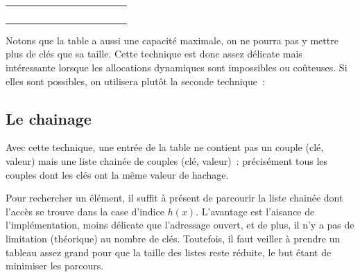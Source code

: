 		\begin{center}
			\tablefirsthead{}
			\tablehead{}
			\tabletail{}
			\tablelasttail{}
			\begin{supertabular}{m{0.999cm}m{0.999cm}m{0.999cm}m{0.999cm}m{0.999cm}m{0.999cm}m{0.999cm}m{0.999cm}m{0.999cm}m{0.999cm}}
			 &
			 &
			 &
			 &
			 &
			 &
			 &
			 &
			 &
			\centering{}\\\hline
			 &
			 &
			 &
			 &
			 &
			 &
			 &
			 &
			 &
			\\\hline
			\end{supertabular}
		\end{center}
		
		Notons que la table a aussi une capacité maximale, on ne pourra 
		pas y mettre plus de clés que sa taille. Cette technique
		est donc assez délicate mais intéressante lorsque les allocations 
		dynamiques sont impossibles ou coûteuses. Si elles
		sont possibles, on utilisera plutôt la seconde technique~:

	\subsection{Le chainage}
		
		Avec cette technique, une entrée de la table ne contient 
		pas un couple (clé, valeur) mais une liste chainée de couples
		(clé, valeur)~: précisément tous les couples dont 
		les clés ont la même valeur de hachage.


		Pour rechercher un élément, il suffit à présent de parcourir 
		la liste chainée dont l'accès se trouve dans la case
		d'indice $h(x)$. L'avantage est l'aisance de 
		l'implémentation, moins délicate que l'adressage ouvert,
		et de plus, il n'y a pas de limitation (théorique) 
		au nombre de clés. Toutefois, il faut veiller à prendre un tableau
		assez grand pour que la taille des listes reste 
		réduite, le but étant de minimiser les parcours.

